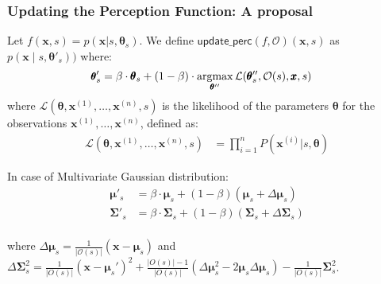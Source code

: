 \documentclass{beamer}
\DeclareMathOperator*{\argmax}{argmax}
\def\updf{\mathsf{update\_perc}}
\def\bmu{\pmb{\mu}}
\def\bSigma{\pmb{\Sigma}}
\def\bx{\pmb{x}}
\def\O{\mathcal{O}}
\def\prm{\pmb{\theta}}
\begin{document}
\begin{frame} 
  \frametitle{Updating the Perception Function: A proposal} 

Let $f(\bx,s) = p(\bx|s,\prm_s)$. We define
$\updf(f,\O)(\bx,s)$ as 
$p(\bx\mid s,\prm'_s))$
where: 
\begin{align}\small
  \label{eq:update-f}
  \prm'_s & = \beta\cdot\prm_s+(1-\beta)\cdot
            \argmax_{\prm''} \mathcal{L}(\prm_s'',\O(s),\bx,s)
\end{align}
where 
$\mathcal{L}(\prm,\bx^{(1)},\dots,\bx^{(n)},s)$ 
is the likelihood of the 
parameters $\prm$ for the observations $\bx^{(1)},\dots,\bx^{(n)}$,
defined as: 
\begin{align}
  \label{eq:max-like-prm}
\mathcal{L}(\prm,\bx^{(1)},\dots,\bx^{(n)},s) & = 
  \prod_{i=1}^nP(\bx^{(i)}|s,\prm)
\end{align}




In case of Multivariate Gaussian distribution:
\begin{align*}
  \bmu'_s & = \beta\cdot\bmu_s+(1-\beta)(\bmu_s + \Delta\bmu_s) \\
  \bSigma'_s & = \beta\cdot\bSigma_s+(1-\beta)(\bSigma_s + \Delta\bSigma_s) \\
\end{align*}

\vspace*{-1cm}
where $\Delta\bmu_s=\frac{1}{|\O(s)|}(\bx-\bmu_s)$
and $\Delta\bSigma^2_s = \frac{1}{|O(s)|}(\bx-\bmu_s')^2 +
\frac{|O(s)|-1}{|O(s)|}(\Delta\bmu_s^2-2\bmu_s\Delta\bmu_s) -\frac{1}{|O(s)|}\bSigma^2_s$.



\end{frame}
\end{document}
